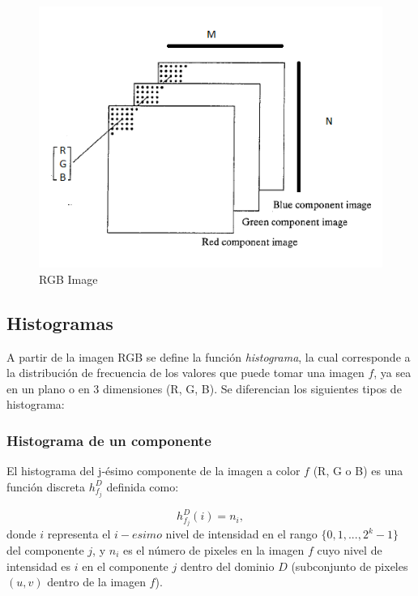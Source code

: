 \begin{figure}[htbp]
	\centering
		\includegraphics[scale=0.65]{fig/ImagenRGB.png}
	\caption{RGB Image}
	\label{fig:ImagenRGB}
\end{figure}

\subsection{Histogramas}

A partir de la imagen RGB se define la función  \emph{histograma}, la cual corresponde a la distribución de frecuencia de los valores que puede tomar una imagen $f$, ya sea en un plano o en 3 dimensiones (R, G, B). Se diferencian los siguientes tipos de histograma:

\subsubsection{Histograma de un componente}

El histograma del j-ésimo componente de la imagen a color $f$ (R, G o B) es una funci\'on discreta $h_{f_j}^{D}$ definida como:%

\begin{equation}
\label{histograma}
   h_{f_j}^{D}(i) = n_i,
\end{equation} 
donde ${i}$ representa el $i-esimo$ nivel de intensidad en el rango $\{0,1,...,2^k-1\}$ del componente $j$, y $n_i$ es el n\'umero de pixeles en la imagen $f$ cuyo nivel de intensidad es $i$ en el componente $j$ dentro del dominio $D$ (subconjunto de pixeles $(u,v)$ dentro de la imagen $f$).

